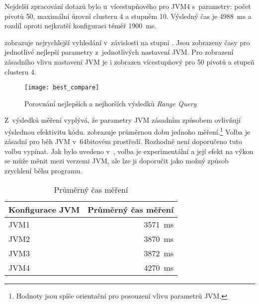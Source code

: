 Nejdelší zpracování dotazů bylo u~vícestupňového  pro JVM4 s~parametry: počet pivotů \num{50}, maximální úrovní clusteru \num{4} a stupněm \BPTree{} \num{10}.
Výsledný čas je \SI{4988}{\ms} a rozdíl oproti nejkratší konfiguraci téměř \SI{1900}{\ms}.

 zobrazuje nejrychlejší vyhledání v~závislosti na stupni \BPTree{}.
Jsou zobrazeny časy pro jednotlivé nejlepší parametry  z~jednotlivých nastavení JVM.
Pro zobrazení zásadního vlivu nastavení JVM je i zobrazen vícestupňový \MIndex{} pro \num{50} pivotů a stupeň clusteru \num{4}.

\begin{figure}[t]
\centering
\texttt{[image: best\_compare]}
\caption{Porovnání nejlepších a nejhorších výsledků \emph{Range Query}}
\label{fig:jvm1p50}
\end{figure}

Z~výsledků měření vyplývá, že parametry JVM zásadním způsobem ovlivňují výslednou efektivitu kódu.
 zobrazuje průměrnou dobu jednoho měření.\footnote{Hodnoty jsou spíše orientační pro posouzení vlivu parametrů JVM.}
Volba  je zásadní pro běh JVM v~64bitovém prostředí.
Rozhodně není doporučeno tuto volbu vypínat.
Jak bylo uvedeno v~, volba  je experimentální a její efekt na výkon se může měnit mezi verzemi JVM, ale lze ji doporučit jako možný způsob zrychlení běhu programu.

\begin{table}[h]
\center
\begin{tabular}{| l  | r |}
\hline
Konfigurace JVM & Průměrný čas měření \\ \hline
\hline
JVM1 & \SI{3571}{\ms} \\ \hline
JVM2 & \SI{3870}{\ms} \\ \hline
JVM3 & \SI{3872}{\ms} \\ \hline
JVM4 & \SI{4270}{\ms} \\ \hline
\end{tabular}
\caption{Průměrný čas měření}
\label{tab:jvmavgtime}
\end{table}

